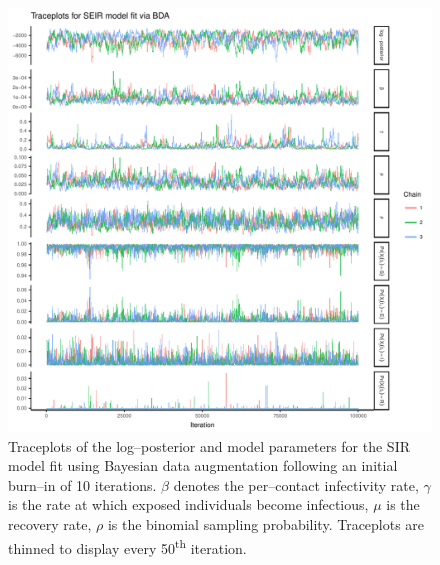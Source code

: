 \begin{figure}[htbp]
	\centering
	\includegraphics[width=0.9\linewidth]{figures/seir_bda_traceplots}
	\caption{Traceplots of the log--posterior and model parameters for the SIR model fit using Bayesian data augmentation following an initial burn--in of 10 iterations. $ \beta $ denotes the per--contact infectivity rate, $ \gamma $ is the rate at which exposed individuals become infectious, $ \mu $ is the recovery rate, $ \rho $ is the binomial sampling probability. Traceplots are thinned to display every 50\textsuperscript{th} iteration.}
	\label{fig:seirbdatraceplots}
\end{figure}

